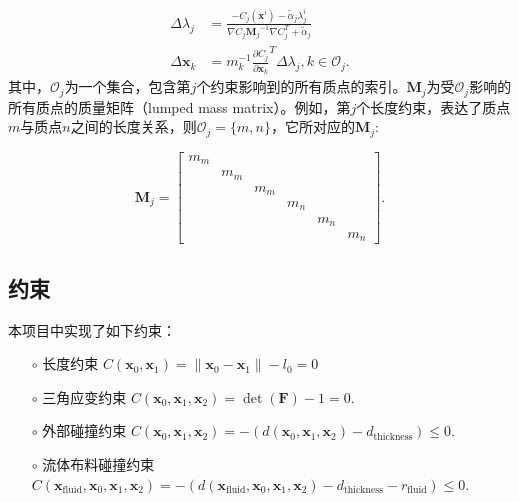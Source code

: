 \begin{align}
	\Delta \lambda_j    & =\frac{-C_j\left(\mathbf{x}^i\right)-\tilde{\alpha}_j \lambda^i_j}{\nabla C_j {\mathbf{M}_j}^{-1} \nabla C_j^T+\tilde{\alpha}_j} \\
	\Delta \mathbf{x}_k & = m_k^{-1} {\frac{\partial C_j}{\partial \mathbf{x}_k}}^T \Delta \lambda_j, k \in \mathcal{O}_j.
\end{align}
其中，$\mathcal{O}_j$为一个集合，包含第$j$个约束影响到的所有质点的索引。$\mathbf{M}_j$为受$\mathcal{O}_j$影响的所有质点的质量矩阵（lumped mass matrix）。例如，第$j$个长度约束，表达了质点$m$与质点$n$之间的长度关系，则$\mathcal{O}_j=\{m, n \}$，它所对应的$\mathbf{M}_j$:

\begin{equation}
	\mathbf{M}_j=
	\begin{bmatrix}

		m_m &     &     &     &     &     \\

		    & m_m &     &     &     &     \\

		    &     & m_m &     &     &     \\

		    &     &     & m_n &     &     \\

		    &     &     &     & m_n &     \\

		    &     &     &     &     & m_n
	\end{bmatrix}.
\end{equation}

\subsection{约束}
本项目中实现了如下约束：
\begin{itemize}
	\item [$\circ$] 长度约束 $C(\mathbf{x}_0, \mathbf{x}_1) = \| \mathbf{x}_0 - \mathbf{x}_1\| - l_0 = 0$
	\item [$\circ$] 三角应变约束 $C\left(\mathbf{x}_{0}, \mathbf{x}_{1}, \mathbf{x}_{2}\right)=\operatorname{det}(\mathbf{F})-1=0$.
	\item [$\circ$] 外部碰撞约束 $C\left(\mathbf{x}_{0}, \mathbf{x}_{1}, \mathbf{x}_{2}\right)=-\left(d\left(\mathbf{x}_{0}, \mathbf{x}_{1}, \mathbf{x}_{2}\right)-d_{\text{thickness}}\right) \leq 0$.
	\item [$\circ$] 流体布料碰撞约束 $C\left(\mathbf{x}_{\text{fluid}},\mathbf{x}_{0}, \mathbf{x}_{1}, \mathbf{x}_{2}\right)=-\left(d\left(\mathbf{x}_{\text{fluid}},\mathbf{x}_{0}, \mathbf{x}_{1}, \mathbf{x}_{2}\right)-d_{\text{thickness}}-r_{\text{fluid}}\right) \leq 0$.
\end{itemize}


